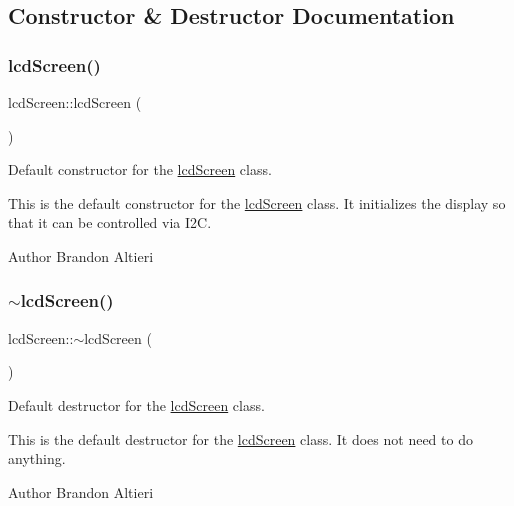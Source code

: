 \subsection{Constructor \& Destructor Documentation}
\mbox{\label{classlcdScreen_a23766b7b298478e9a04d44e9a785152d}} 
\subsubsection{\texorpdfstring{lcd\+Screen()}{lcdScreen()}}
{\footnotesize\ttfamily lcd\+Screen\+::lcd\+Screen (\begin{DoxyParamCaption}{ }\end{DoxyParamCaption})\hspace{0.3cm}{\ttfamily [private]}}



Default constructor for the \hyperlink{classlcdScreen}{lcd\+Screen} class. 

This is the default constructor for the \hyperlink{classlcdScreen}{lcd\+Screen} class. It initializes the display so that it can be controlled via I2C.

\begin{DoxyAuthor}{Author}
Brandon Altieri 
\end{DoxyAuthor}
\mbox{\label{classlcdScreen_a6152bfe573104feced7d836e1eff4d8d}} 
\subsubsection{\texorpdfstring{$\sim$lcd\+Screen()}{~lcdScreen()}}
{\footnotesize\ttfamily lcd\+Screen\+::$\sim$lcd\+Screen (\begin{DoxyParamCaption}{ }\end{DoxyParamCaption})\hspace{0.3cm}{\ttfamily [private]}}



Default destructor for the \hyperlink{classlcdScreen}{lcd\+Screen} class. 

This is the default destructor for the \hyperlink{classlcdScreen}{lcd\+Screen} class. It does not need to do anything.

\begin{DoxyAuthor}{Author}
Brandon Altieri 
\end{DoxyAuthor}


